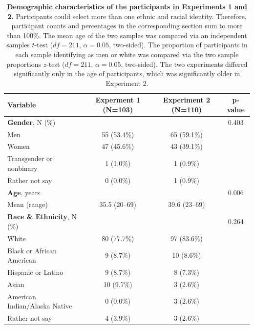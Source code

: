 \documentclass[a4paper,12pt]{article}
\begin{document}
\begin{refsection}[supp]
\begin{table}[h]
    \centering
    \begin{tabular*}{\textwidth}{lccc}
    \toprule
    Variable & \small Experment 1 (N=103) & \small Experiment 2 (N=110)  & p-value \\
    \midrule
    \textbf{Gender}, N (\%)                & & & 0.403 \\
    \hspace{1em} Men                       & 55 (53.4\%) & 65 (59.1\%) & \\
    \hspace{1em} Women                     & 47 (45.6\%) & 43 (39.1\%) & \\
    \hspace{1em} Transgender or nonbinary         &   1  (1.0\%) &   1  (0.9\%) & \\
    \hspace{1em} Rather not say            &   0  (0.0\%) &   1  (0.9\%) & \\
    \midrule
    \textbf{Age}, years                      & & & 0.006 \\
    \hspace{1em} Mean (range)              & 35.5 (20--69) & 39.6 (23--69) & \\
    \midrule
    \textbf{Race \& Ethnicity}, N (\%)                  & & & 0.264 \\
    \hspace{1em} White                     & 80 (77.7\%) &  97 (83.6\%) & \\ 
    \hspace{1em} Black or African American &  9  (8.7\%) &  10  (8.6\%) & \\
    \hspace{1em} Hispanic or Latino        &  9  (8.7\%) &  8  (7.3\%) & \\
    \hspace{1em} Asian                     & 10  (9.7\%) &   3  (2.6\%) & \\
    \hspace{1em} American Indian/Alaska Native & 0 (0.0\%) & 3 (2.6\%) & \\
    \hspace{1em} Rather not say            &  4  (3.9\%) &  3  (2.6\%) & \\
    \bottomrule
    \end{tabular*}
    \caption{{\bf Demographic characteristics of the participants in Experiments 1 and 2.}  Participants could select more than one ethnic and racial identity. Therefore, participant counts and percentages in the corresponding section sum to more than 100\%. The mean age of the two samples was compared via an independent samples $t$-test ($df = 211$, $\alpha = 0.05$, two-sided). The proportion of participants in each sample identifying as men or white was compared via the two sample proportions $z$-test ($df = 211$, $\alpha = 0.05$, two-sided). The two experiments differed significantly only in the age of participants, which was significantly older in Experiment 2.}
    \label{tab:demographics}
\end{table}


\end{refsection}
\end{document}
